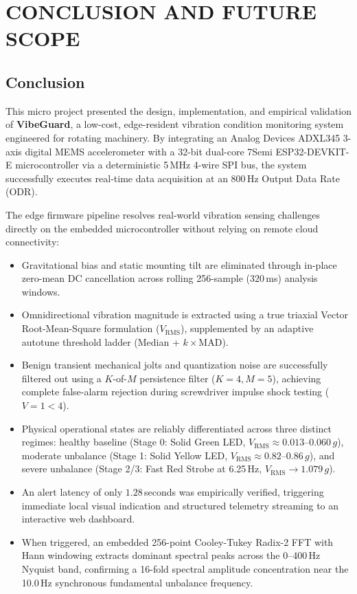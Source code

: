 \chapter{CONCLUSION AND FUTURE SCOPE}
\label{ch:conclusion_future_scope}

\section{Conclusion}
\hspace{2em}This micro project presented the design, implementation, and empirical validation of \textbf{VibeGuard}, a low-cost, edge-resident vibration condition monitoring system engineered for rotating machinery. By integrating an Analog Devices ADXL345 3-axis digital MEMS accelerometer with a 32-bit dual-core 7Semi ESP32-DEVKIT-E microcontroller via a deterministic 5\,MHz 4-wire SPI bus, the system successfully executes real-time data acquisition at an 800\,Hz Output Data Rate (ODR).

\hspace{2em}The edge firmware pipeline resolves real-world vibration sensing challenges directly on the embedded microcontroller without relying on remote cloud connectivity:
\begin{itemize}
    \item Gravitational bias and static mounting tilt are eliminated through in-place zero-mean DC cancellation across rolling 256-sample ($320$\,ms) analysis windows.
    \item Omnidirectional vibration magnitude is extracted using a true triaxial Vector Root-Mean-Square formulation ($V_{\mathrm{RMS}}$), supplemented by an adaptive autotune threshold ladder (Median + $k \times \mathrm{MAD}$).
    \item Benign transient mechanical jolts and quantization noise are successfully filtered out using a $K$-of-$M$ persistence filter ($K = 4, M = 5$), achieving complete false-alarm rejection during screwdriver impulse shock testing ($V=1 < 4$).
    \item Physical operational states are reliably differentiated across three distinct regimes: healthy baseline (Stage 0: Solid Green LED, $V_{\mathrm{RMS}} \approx 0.013$--$0.060\,g$), moderate unbalance (Stage 1: Solid Yellow LED, $V_{\mathrm{RMS}} \approx 0.82$--$0.86\,g$), and severe unbalance (Stage 2/3: Fast Red Strobe at 6.25\,Hz, $V_{\mathrm{RMS}} \to 1.079\,g$).
    \item An alert latency of only $1.28$\,seconds was empirically verified, triggering immediate local visual indication and structured telemetry streaming to an interactive web dashboard.
    \item When triggered, an embedded 256-point Cooley-Tukey Radix-2 FFT with Hann windowing extracts dominant spectral peaks across the 0--400\,Hz Nyquist band, confirming a 16-fold spectral amplitude concentration near the 10.0\,Hz synchronous fundamental unbalance frequency.
\end{itemize}

